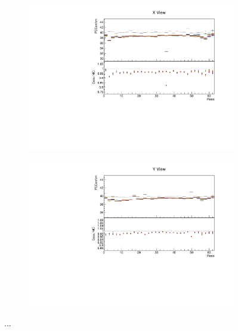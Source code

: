 \documentclass[12pt,a4paper]{article}
\begin{document}
\begin{figure}[!ht]
\begin{subfigure}{0.5\textwidth}
  \end{subfigure}
  \begin{subfigure}{0.5\textwidth}
    \includegraphics[width=\linewidth]{essentialsec_tb/pecorrcm_plane_x.pdf}
  \end{subfigure}
  \begin{subfigure}{0.5\textwidth}
    \includegraphics[width=\linewidth]{essentialsec_tb/pecorrcm_plane_y.pdf}
  \end{subfigure}
  \caption{...}
  \label{figAbsCalibPlane1}
\end{figure}
\end{document}
